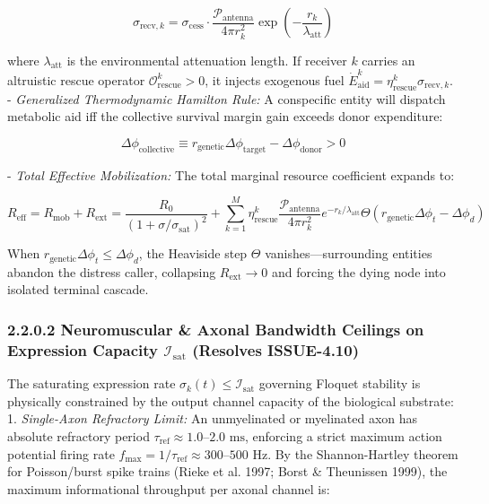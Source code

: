 \documentclass[11pt,a4paper]{article}
\theoremstyle{definition}
\theoremstyle{remark}
\begin{document}
\begin{equation}
\sigma_{\text{recv},k} = \sigma_{\text{cess}} \cdot \frac{\mathcal{P}_{\text{antenna}}}{4\pi r_k^2} \exp\left(-\frac{r_k}{\lambda_{\text{att}}}\right)
\end{equation}


where $\lambda_{\text{att}}$ is the environmental attenuation length. If receiver $k$ carries an altruistic rescue operator $\mathcal{O}_{\text{rescue}}^k > 0$, it injects exogenous fuel $\dot{E}_{\text{aid}}^k = \eta_{\text{rescue}}^k \sigma_{\text{recv},k}$.
- \textit{Generalized Thermodynamic Hamilton Rule:} A conspecific entity will dispatch metabolic aid iff the collective survival margin gain exceeds donor expenditure:


\begin{equation}
\Delta \phi_{\text{collective}} \equiv r_{\text{genetic}} \Delta \phi_{\text{target}} - \Delta \phi_{\text{donor}} > 0
\end{equation}


- \textit{Total Effective Mobilization:} The total marginal resource coefficient expands to:


\begin{equation}
\boxed{R_{\text{eff}} = R_{\text{mob}} + R_{\text{ext}} = \frac{R_0}{(1 + \sigma/\sigma_{\text{sat}})^2} + \sum_{k=1}^M \eta_{\text{rescue}}^k \frac{\mathcal{P}_{\text{antenna}}}{4\pi r_k^2} e^{-r_k/\lambda_{\text{att}}} \Theta\left(r_{\text{genetic}}\Delta\phi_t - \Delta\phi_d\right)}
\end{equation}


When $r_{\text{genetic}}\Delta\phi_t \le \Delta\phi_d$, the Heaviside step $\Theta$ vanishes—surrounding entities abandon the distress caller, collapsing $R_{\text{ext}} \to 0$ and forcing the dying node into isolated terminal cascade.

\subsubsection{2.2.0.2 Neuromuscular \& Axonal Bandwidth Ceilings on Expression Capacity $\mathcal{I}_{\text{sat}}$ (Resolves ISSUE-4.10)}

The saturating expression rate $\sigma_k(t) \le \mathcal{I}_{\text{sat}}$ governing Floquet stability is physically constrained by the output channel capacity of the biological substrate:
1. \textit{Single-Axon Refractory Limit:} An unmyelinated or myelinated axon has absolute refractory period $\tau_{\text{ref}} \approx 1.0\text{--}2.0\text{ ms}$, enforcing a strict maximum action potential firing rate $f_{\max} = 1/\tau_{\text{ref}} \approx 300\text{--}500\text{ Hz}$. By the Shannon-Hartley theorem for Poisson/burst spike trains (Rieke et al. 1997; Borst \& Theunissen 1999), the maximum informational throughput per axonal channel is:
\end{document}
